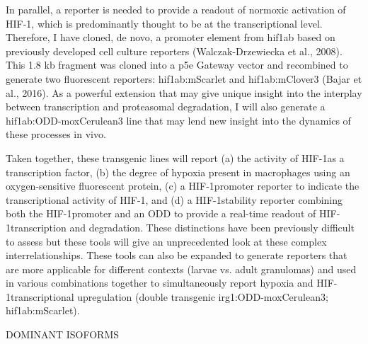 In parallel, a reporter is needed to provide a readout of normoxic activation of HIF-1\textalpha, which is predominantly thought to be at the transcriptional level. Therefore, I have cloned, de novo, a promoter element from hif1ab based on previously developed cell culture reporters (Walczak-Drzewiecka et al., 2008). This 1.8 kb fragment was cloned into a p5e Gateway vector and recombined to generate two fluorescent reporters: hif1ab:mScarlet and hif1ab:mClover3 (Bajar et al., 2016). As a powerful extension that may give unique insight into the interplay between transcription and proteasomal degradation, I will also generate a hif1ab:ODD-moxCerulean3 line that may lend new insight into the dynamics of these processes in vivo. 

Taken together, these transgenic lines will report (a) the activity of HIF-1\textalpha as a transcription factor, (b) the degree of hypoxia present in macrophages using an oxygen-sensitive fluorescent protein, (c) a HIF-1\textalpha promoter reporter to indicate the transcriptional activity of HIF-1\textalpha, and (d) a HIF-1\textalpha stability reporter combining both the HIF-1\textalpha promoter and an ODD to provide a real-time readout of HIF-1\textalpha transcription and degradation. These distinctions have been previously difficult to assess but these tools will give an unprecedented look at these complex interrelationships. These tools can also be expanded to generate reporters that are more applicable for different contexts (larvae vs. adult granulomas) and used in various combinations together to simultaneously report hypoxia and HIF-1\textalpha transcriptional upregulation (double transgenic irg1:ODD-moxCerulean3; hif1ab:mScarlet).

DOMINANT ISOFORMS

